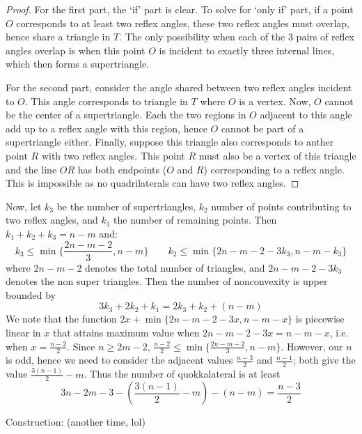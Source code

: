 \documentclass[11pt,a4paper]{article}
\begin{document}
\begin{enumerate}
        \begin{proof}
        	For the first part, the `if' part is clear. To solve for `only if' part, if a point $O$ corresponds to at least two reflex angles, 
        	these two reflex angles must overlap, 
        	hence share a triangle in $T$. The only possibility when each of the 3 pairs of reflex angles overlap is when this point $O$ is incident to exactly three internal lines, which then forms a supertriangle. 
        	
        	For the second part, consider the angle shared between two reflex angles incident to $O$. This angle corresponds to  triangle in $T$ where $O$ is a vertex. 
        	Now, $O$ cannot be the center of a supertriangle. 
        	Each the two regions in $O$ adjacent to this angle add up to a reflex angle with this region, hence $O$ cannot be part of a supertriangle either. 
        	Finally, suppose this triangle also corresponds to anther point $R$ with two reflex angles. 
        	This point $R$ must also be a vertex of this triangle and the line $OR$ has both endpoints ($O$ and $R$) corresponding to a reflex angle. 
        	This is impossible as no quadrilaterals can have two reflex angles. 
        \end{proof}
        
        
        
        Now, let $k_3$ be the number of supertriangles, 
        $k_2$ number of points contributing to two reflex angles, 
        and $k_1$ the number of remaining points. Then $k_1+k_2+k_3=n - m$ and: 
        \[
        k_3\le \min \{\frac{2n-m-2}{3}, n - m\}
        \qquad 
        k_2\le \min \{2n - m - 2 - 3k_3, n - m - k_3\}
        \]
        where $2n-m-2$ denotes the total number of triangles, 
        and $2n - m - 2 - 3k_3$ denotes the non super triangles. 
        Then the number of nonconvexity is upper bounded by 
        \[
        3k_3+2k_2+k_1 = 2k_3 + k_2 + (n - m)
        \]
        We note that the function $2x + \min \{2n - m - 2 - 3x, n - m - x\}$ is piecewise linear in $x$ that attains maximum value when $2n - m - 2 - 3x = n - m - x$, i.e. when $x = \frac{n - 2}{2}$. 
        Since $n \ge 2m - 2$, $\frac{n-2}{2}\le \min \{\frac{2n-m-2}{3}, n - m\}$. 
        However, our $n$ is odd, hence we need to consider the adjacent values $\frac{n-3}{2}$ and $\frac{n-1}{2}$; 
        both give the value $\frac{3(n-1)}{2}-m$. 
        Thus the number of quokkalateral is at least 
        \[
        3n - 2m - 3 - (\frac{3(n-1)}{2} - m) - (n - m)
        =\frac{n - 3}{2}
        \]
        
        Construction: (another time, lol)
    	
    \end{enumerate}
    
\end{document}
